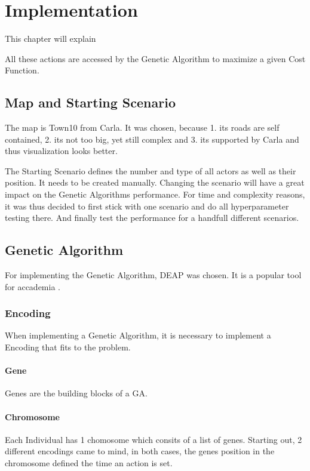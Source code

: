 \chapter{Implementation}
This chapter will explain 


All these actions are accessed by the Genetic Algorithm to maximize a given Cost Function.

\section{Map and Starting Scenario}
The map is Town10 from Carla. It was chosen, because 1. its roads are self contained, 2. its not too big, yet still complex and 3. its supported by Carla and thus visualization looks better.

The Starting Scenario defines the number and type of all actors as well as their position. It needs to be created manually.
Changing the scenario will have a great impact on the Genetic Algorithms performance. For time and complexity reasons, it was thus decided to first stick with one scenario and do all hyperparameter testing there. And finally test the performance for a handfull different scenarios.

\section{Genetic Algorithm}
For implementing the Genetic Algorithm, DEAP was chosen. It is a popular tool for accademia .


\subsection{Encoding}
When implementing a Genetic Algorithm, it is necessary to implement a Encoding that fits to the problem.

\subsubsection{Gene}
Genes are the building blocks of a GA.

\subsubsection{Chromosome}
Each Individual has 1 chomosome which consits of a list of genes. Starting out, 2 different encodings came to mind, in both cases, the genes position in the chromosome defined the time an action is set.

